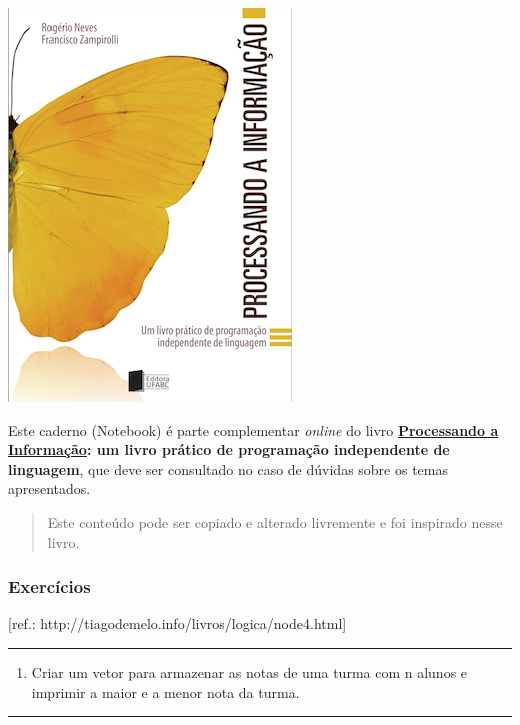 \documentclass[12pt,a4paper]{article}
\providecommand{\tightlist}{%
      \setlength{\itemsep}{0pt}\setlength{\parskip}{0pt}}
\begin{document}
    \includegraphics{"figs/Capa_Processando_Informacao.jpg"}

Este caderno (Notebook) é parte complementar \emph{online} do livro
\textbf{\href{https://editora.ufabc.edu.br/matematica-e-ciencias-da-computacao/58-processando-a-informacao}{Processando
a Informação}: um livro prático de programação independente de
linguagem}, que deve ser consultado no caso de dúvidas sobre os temas
apresentados.

\begin{quote}
Este conteúdo pode ser copiado e alterado livremente e foi inspirado
nesse livro.
\end{quote}

    \hypertarget{exercuxedcios}{%
\subsubsection{Exercícios}\label{exercuxedcios}}

{[}ref.: http://tiagodemelo.info/livros/logica/node4.html{]}

    \begin{center}\rule{0.5\linewidth}{0.5pt}\end{center}

\begin{enumerate}
\def\labelenumi{\arabic{enumi}.}
\tightlist
\item
  Criar um vetor para armazenar as notas de uma turma com n alunos e
  imprimir a maior e a menor nota da turma.
\end{enumerate}

    \begin{center}\rule{0.5\linewidth}{0.5pt}\end{center}
\end{document}
